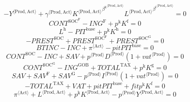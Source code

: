 \begin{equation}
-{Y}^{\langle \mathrm{Prod},\mathrm{Act}\rangle} + {{\gamma}^{\langle \mathrm{\mathrm{Prod}},\mathrm{\mathrm{Act}}\rangle}} {{{K}^{\langle \mathrm{Prod},\mathrm{Act}\rangle}}^{{\beta^{\mathrm{k}}}^{\langle \mathrm{\mathrm{Prod}},\mathrm{\mathrm{Act}}\rangle}}} {{{L}^{\langle \mathrm{Prod},\mathrm{Act}\rangle}}^{{\beta^{\mathrm{l}}}^{\langle \mathrm{\mathrm{Prod}},\mathrm{\mathrm{Act}}\rangle}}} = 0
\end{equation}
\begin{equation}
{C\!O\!N\!T}^{\mathrm{SOC}^{\mathrm{F}}} - {I\!N\!G}^{\mathrm{F}} + {p^{\mathrm{k}}} {K^{\mathrm{f}}} = 0
\end{equation}
\begin{equation}
L^{\mathrm{h}} - {P\!I\!T}^{\mathrm{base}} + {p^{\mathrm{k}}} {K^{\mathrm{h}}} = 0
\end{equation}
\begin{equation}
-{P\!R\!E\!S\!T}^{\mathrm{SOC}} + {P\!R\!E\!S\!T}^{\mathrm{SOC}^{\mathrm{F}}} + {P\!R\!E\!S\!T}^{\mathrm{SOC}^{\mathrm{G}}} = 0
\end{equation}
\begin{equation}
{B\!T\!I\!N\!C} - {I\!N\!C} + {\pi}^{\langle \mathrm{Act}\rangle} - {{p\!i\!t}} {{P\!I\!T}^{\mathrm{base}}} = 0
\end{equation}
\begin{equation}
{C\!O\!N\!T}^{\mathrm{SOC}} - {I\!N\!C} + {S\!A\!V} + {{p}^{\langle \mathrm{Prod}\rangle}} {{D}^{\langle \mathrm{Prod}\rangle}} \left(1 + {{v\!a\!t}}^{\langle \mathrm{\mathrm{Prod}}\rangle}\right) = 0
\end{equation}
\begin{equation}
{C\!O\!N\!T}^{\mathrm{SOC}^{\mathrm{G}}} - {I\!N\!G}^{\mathrm{GOB}} + {T\!O\!T\!A\!L}^{\mathrm{TAX}} + {p^{\mathrm{k}}} {K^{\mathrm{g}}} = 0
\end{equation}
\begin{equation}
{S\!A\!V} + {S\!A\!V}^{\mathrm{F}} + {S\!A\!V}^{\mathrm{G}} - {{p}^{\langle \mathrm{Prod}\rangle}} {{I}^{\langle \mathrm{Prod}\rangle}} \left(1 + {{v\!a\!t}}^{\langle \mathrm{\mathrm{Prod}}\rangle}\right) = 0
\end{equation}
\begin{equation}
-{T\!O\!T\!A\!L}^{\mathrm{TAX}} + {V\!A\!T} + {{p\!i\!t}} {{P\!I\!T}^{\mathrm{base}}} + {{f\!i\!t}} {p^{\mathrm{k}}} {K^{\mathrm{f}}} = 0
\end{equation}
\begin{equation}
{\pi}^{\langle \mathrm{Act}\rangle} + {L}^{\langle \mathrm{Prod},\mathrm{Act}\rangle} + {p^{\mathrm{k}}} {{K}^{\langle \mathrm{Prod},\mathrm{Act}\rangle}} - {{p}^{\langle \mathrm{Prod}\rangle}} {{Y}^{\langle \mathrm{Prod},\mathrm{Act}\rangle}} = 0
\end{equation}
